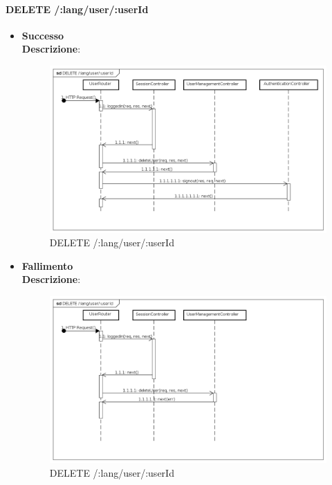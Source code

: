 
\paragraph{DELETE /:lang/user/:userId}
\begin{itemize}
\item \textbf{Successo} \\
\textbf{Descrizione}:
\label{Procedura di eliminazione account}
\begin{figure}[ht]
	\centering
	\includegraphics[scale=0.40]{UML/DiagrammiDiSequenza/Back-end/DELETE_LangUserUseridSuccess.png}
	\caption{DELETE /:lang/user/:userId}
\end{figure}

\FloatBarrier

\item \textbf{Fallimento} \\
	\textbf{Descrizione}:
\label{Fallimento della procedura di eliminazione account}
\begin{figure}[ht]
	\centering
	\includegraphics[scale=0.40]{UML/DiagrammiDiSequenza/Back-end/DELETE_LangUserUseridFailure.png}
	\caption{DELETE /:lang/user/:userId}
\end{figure}

\FloatBarrier
\end{itemize}

